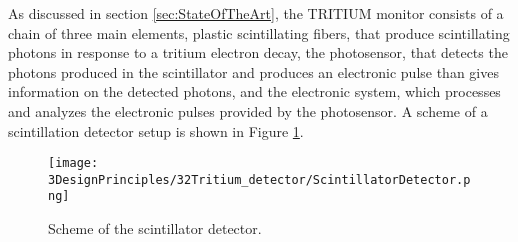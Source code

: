 As discussed in section \ref{sec:StateOfTheArt}, the TRITIUM monitor consists of a chain of three main elements, plastic scintillating fibers, that produce scintillating photons in response to a tritium electron decay, the photosensor, that detects the photons produced in the scintillator and produces an electronic pulse than gives information on the detected photons, and the electronic system, which processes and analyzes the electronic pulses provided by the photosensor. A scheme of a scintillation detector setup is shown in Figure \ref{fig:ScintillatorDetector}.

\begin{figure}[hbtp]
\texttt{[image: 3DesignPrinciples/32Tritium\_detector/ScintillatorDetector.png]}
\centering
\caption{Scheme of the scintillator detector.\label{fig:ScintillatorDetector}}
\end{figure}
